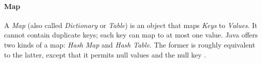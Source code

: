 %
%
%
%
%
%
%

\paragraph{Map}
\label{map_heading}

A \emph{Map} (also called \emph{Dictionary} or \emph{Table}) is an object that
maps \emph{Keys} to \emph{Values}. It cannot contain duplicate keys; each key
can map to at most one value. Java offers two kinds of a map: \emph{Hash Map}
and \emph{Hash Table}. The former is roughly equivalent to the latter, except
that it permits null values and the null key \cite{java, gumbel}.
